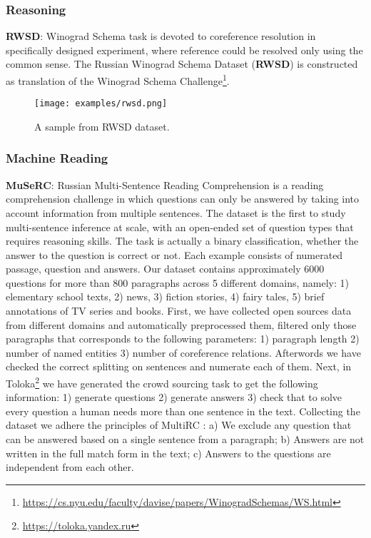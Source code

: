 \documentclass[11pt,a4paper]{article}
\begin{document}
\subsubsection{Reasoning}

\textbf{RWSD}: Winograd Schema task is devoted to coreference resolution in specifically designed experiment, where reference could be resolved only using the common sense. The Russian Winograd Schema Dataset (\textbf{RWSD}) is constructed as translation of the Winograd Schema Challenge\footnote{\url{https://cs.nyu.edu/faculty/davise/papers/WinogradSchemas/WS.html}}.

\begin{figure}[h!]
    \centering
    \texttt{[image: examples/rwsd.png]}
    \caption{A sample from RWSD dataset.}
    \label{fig:sample-rwsd}
\end{figure}

\subsubsection{Machine Reading}

\textbf{MuSeRC}: Russian Multi-Sentence Reading Comprehension is a reading comprehension challenge in which questions can only be answered by taking into account information from multiple sentences. The dataset is the first to study multi-sentence inference at scale, with an open-ended set of question types that requires reasoning skills. 
The task is actually a binary classification, whether the answer to the question is correct or not. Each example consists of numerated passage, question and answers.
Our dataset contains approximately 6000 questions for more than 800 paragraphs across 5 different domains, namely: 1) elementary school texts, 2) news, 3) fiction stories, 4) fairy tales, 5) brief annotations of TV series and books.
First, we have collected open sources data from different domains and automatically preprocessed them, filtered only those paragraphs that corresponds to the following parameters: 1) paragraph length 2) number of named entities 3) number of coreference relations. Afterwords we have checked the correct splitting on sentences and numerate each of them. Next, in Toloka\footnote{\url{https://toloka.yandex.ru}} we have generated the crowd sourcing task to get the following information: 1) generate questions 2) generate answers 3) check that to solve every question a human needs more than one sentence in the text.
Collecting the dataset we adhere the principles of MultiRC \cite{MultiRC2018}: a) We exclude any question that can be answered based on a single sentence from a paragraph; b) Answers are not written in the full match form in the text; c)	Answers to the questions are independent from each other. 
\end{document}
